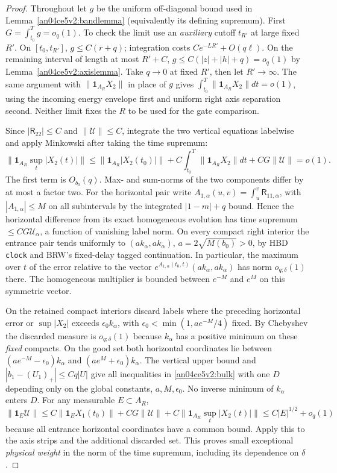 \documentclass[11pt]{article}
\begin{document}
\begin{proof}
Throughout let $g$ be the uniform off-diagonal bound used in Lemma~\ref{an04ce5v2:bandlemma} (equivalently its defining supremum). First $G=\int_{t_0}^Tg=o_q(1)$. To check the limit use an \emph{auxiliary} cutoff $t_{R'}$ at large fixed $R'$. On $[t_0,t_{R'}]$, $g\le C(r+q)$; integration costs $Ce^{-LR'}+O(q\ell)$. On the remaining interval of length at most $R'+C$, $g\le C(|z|+|h|+q)=o_q(1)$ by Lemma~\ref{an04ce5v2:axislemma}. Take $q\to0$ at fixed $R'$, then let $R'\to\infty$. The same argument with $\|\mathbf1_{A_R}X_2\|$ in place of $g$ gives $\int_{t_0}^T\|\mathbf1_{A_R}X_2\|dt=o(1)$, using the incoming energy envelope first and uniform right axis separation second. Neither limit fixes the $R$ to be used for the gate comparison.

Since $|\mathsf R_{22}|\le C$ and $\|\mathcal U\|\le C$, integrate the two vertical equations labelwise and apply Minkowski after taking the time supremum:
\[
 \|\mathbf1_{A_R}\sup_t |X_2(t)|\|
 \le \|\mathbf1_{A_R}|X_2(t_0)|\|
     +C\int_{t_0}^T\|\mathbf1_{A_R} X_2\|dt+C G\|\mathcal U\|=o(1).
\]
The first term is $O_{b_0}(q)$. Max- and sum-norms of the two components differ by at most a factor two. For the horizontal pair write $A_{1,\alpha}(u,v)=\int_u^v\mathsf R_{11,\alpha}$, with $|A_{1,\alpha}|\le M$ on all subintervals by the integrated $|1-m|+q$ bound. Hence the horizontal difference from its exact homogeneous evolution has time supremum $\le C G\mathcal U_\alpha$, a function of vanishing label norm. On every compact right interior the entrance pair tends uniformly to $(a k_\alpha,a k_\alpha)$, $a=2\sqrt{M(b_0)}>0$, by HBD \texttt{clock} and BRW's fixed-delay tagged continuation. In particular, the maximum over $t$ of the error relative to the vector $e^{A_{1,\alpha}(t_0,t)}(a k_\alpha,a k_\alpha)$ has norm $o_{q;\delta}(1)$ there. The homogeneous multiplier is bounded between $e^{-M}$ and $e^M$ on this symmetric vector.

On the retained compact interiors discard labels where the preceding horizontal error or $\sup |X_2|$ exceeds $\epsilon_0 k_\alpha$, with $\epsilon_0<\min(1,a e^{-M}/4)$ fixed. By Chebyshev the discarded measure is $o_{q;\delta}(1)$ because $k_\alpha$ has a positive minimum on these \emph{fixed} compacts. On the good set both horizontal coordinates lie between $(a e^{-M}-\epsilon_0)k_\alpha$ and $(a e^M+\epsilon_0)k_\alpha$. The vertical upper bound and $|b_1-(U_1)_+|\le Cq|U|$ give all inequalities in \eqref{an04ce5v2:bulk} with one $D$ depending only on the global constants, $a,M,\epsilon_0$. No inverse minimum of $k_\alpha$ enters $D$. For any measurable $E\subset A_R$,
\[
 \|\mathbf1_E\mathcal U\|\le C\|\mathbf1_E X_1(t_0)\|+
 C G\|\mathcal U\|+C\|\mathbf1_{A_R}\sup_t |X_2(t)|\|
 \le C |E|^{1/2}+o_q(1)
\]
because all entrance horizontal coordinates have a common bound. Apply this to the axis strips and the additional discarded set. This proves small exceptional \emph{physical weight} in the norm of the time supremum, including its dependence on $\delta$.


\end{proof}
\end{document}
